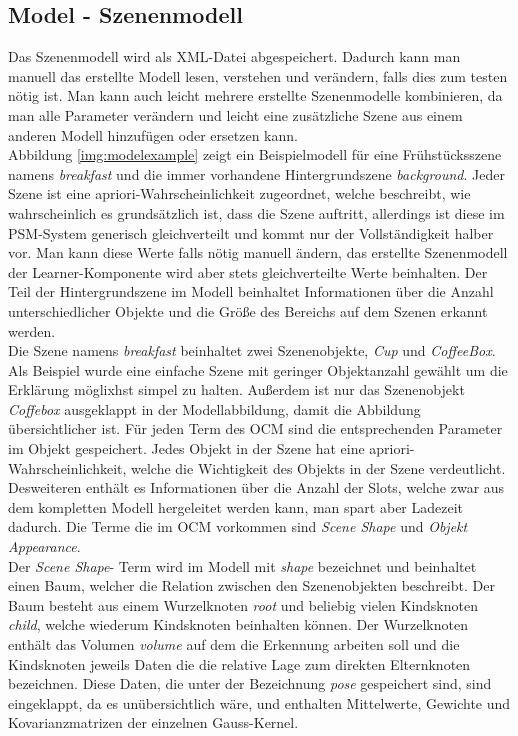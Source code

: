 \subsection{Model - Szenenmodell}
Das Szenenmodell wird als XML-Datei abgespeichert. Dadurch kann man manuell das erstellte Modell lesen, verstehen und verändern, falls dies zum testen nötig ist. Man kann auch leicht mehrere erstellte Szenenmodelle kombinieren, da man alle Parameter verändern und leicht eine zusätzliche Szene aus einem anderen Modell hinzufügen oder ersetzen kann. \smallskip\\ 
Abbildung \ref{img:modelexample} zeigt ein Beispielmodell für eine Frühstücksszene namens \textit{breakfast} und die immer vorhandene Hintergrundszene \textit{background}. Jeder Szene ist eine apriori-Wahrscheinlichkeit zugeordnet, welche beschreibt, wie wahrscheinlich es grundsätzlich ist, dass die Szene auftritt, allerdings ist diese im PSM-System generisch gleichverteilt und kommt nur der Vollständigkeit halber vor. Man kann diese Werte falls nötig manuell ändern, das erstellte Szenenmodell der Learner-Komponente wird aber stets gleichverteilte Werte beinhalten. Der Teil der Hintergrundszene im Modell beinhaltet Informationen über die Anzahl unterschiedlicher Objekte und die Größe des Bereichs auf dem Szenen erkannt werden.\smallskip\\
Die Szene namens \textit{breakfast} beinhaltet zwei Szenenobjekte, \textit{Cup} und \textit{CoffeeBox}. Als Beispiel wurde eine einfache Szene mit geringer Objektanzahl gewählt um die Erklärung möglixhst simpel zu halten. Außerdem ist nur das Szenenobjekt \textit{Coffebox} ausgeklappt in der Modellabbildung, damit die Abbildung übersichtlicher ist. Für jeden Term des OCM sind die entsprechenden Parameter im Objekt gespeichert. Jedes Objekt in der Szene hat eine apriori-Wahrscheinlichkeit, welche die Wichtigkeit des Objekts in der Szene verdeutlicht. Desweiteren enthält es Informationen über die Anzahl der Slots, welche zwar aus dem kompletten Modell hergeleitet werden kann, man spart aber Ladezeit dadurch. Die Terme die im OCM vorkommen sind \textit{Scene Shape} und \textit{Objekt Appearance}.\smallskip\\
Der \textit{Scene Shape}- Term wird im Modell mit \textit{shape} bezeichnet und beinhaltet einen Baum, welcher die Relation zwischen den Szenenobjekten beschreibt. Der Baum besteht aus einem Wurzelknoten \textit{root} und beliebig vielen Kindsknoten \textit{child}, welche wiederum Kindsknoten beinhalten können. Der Wurzelknoten enthält das Volumen \textit{volume} auf dem die Erkennung arbeiten soll und die Kindsknoten jeweils Daten die die relative Lage zum direkten Elternknoten bezeichnen. Diese Daten, die unter der Bezeichnung \textit{pose} gespeichert sind, sind eingeklappt, da es unübersichtlich wäre, und enthalten Mittelwerte, Gewichte und Kovarianzmatrizen der einzelnen Gauss-Kernel.\smallskip\\
